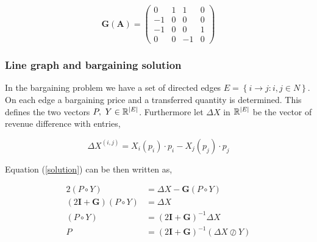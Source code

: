 \documentclass[american]{scrartcl}
\newcommand{\R}{\mathbb{R}}
\newcommand{\matr}[1]{\bm{#1}}
\newcommand{\set}[1]{\left\{#1\right\}}
\DeclarePairedDelimiter\abs{\lvert}{\rvert}%
\begin{document}
\vspace{0.5em}
\begin{minipage}{0.6\textwidth}
\end{minipage} \hfill
\begin{minipage}{0.35\textwidth}
	\begin{equation*}
		\matr{G}(\matr{A}) = \begin{pmatrix}
			0   & 1 & 1   & 0 \\
			- 1 & 0 & 0   & 0 \\
			- 1 & 0 & 0   & 1 \\
			0   & 0 & - 1 & 0
		\end{pmatrix}
	\end{equation*}
\end{minipage}




\subsubsection{Line graph and bargaining solution}

In the bargaining problem we have a set of directed edges $E = \set{i \to j: i, j \in N}$. On each edge a bargaining price and a transferred quantity is determined. This defines the two vectors $P, \ Y \in \R^{\abs{E}}$. Furthermore let $\Delta X$ in $\R^{\abs{E}}$ be the vector of revenue difference with entries,

\begin{equation}
	\Delta X^{(i, j)} = X_i(p_i) \cdot p_i - X_{j}(p_j) \cdot p_j
\end{equation}

Equation (\ref{solution}) can be then written as,

\begin{equation} \label{matrix_solution}
	\begin{split}
		2(P \circ Y) &= \Delta X - \matr{G} \left( P \circ Y \right) \\
		(2\matr{I} + \matr{G}) (P \circ Y) &= \Delta X \\
		(P \circ Y) &= (2\matr{I} + \matr{G})^{-1} \Delta X \\
		P &= (2\matr{I} + \matr{G})^{-1} (\Delta X \oslash Y)
	\end{split}
\end{equation}
\end{document}
